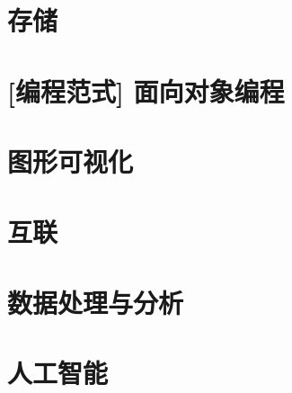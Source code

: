 \documentclass{YBXstyle}
\begin{document}
\part{存储}





\part{[编程范式] 面向对象编程}


\part{图形可视化}












\part{互联}








\part{数据处理与分析}






\part{人工智能}
% 





\end{document}
